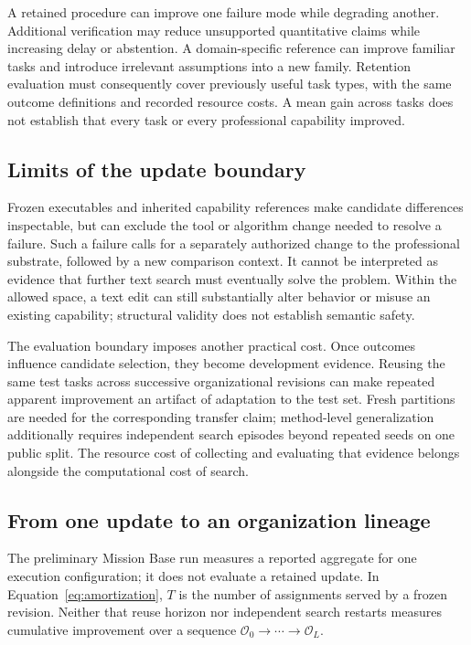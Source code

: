 A retained procedure can improve one failure mode while degrading another. Additional verification may reduce unsupported quantitative claims while increasing delay or abstention. A domain-specific reference can improve familiar tasks and introduce irrelevant assumptions into a new family. Retention evaluation must consequently cover previously useful task types, with the same outcome definitions and recorded resource costs. A mean gain across tasks does not establish that every task or every professional capability improved.

\subsection{Limits of the update boundary}
Frozen executables and inherited capability references make candidate differences inspectable, but can exclude the tool or algorithm change needed to resolve a failure. Such a failure calls for a separately authorized change to the professional substrate, followed by a new comparison context. It cannot be interpreted as evidence that further text search must eventually solve the problem. Within the allowed space, a text edit can still substantially alter behavior or misuse an existing capability; structural validity does not establish semantic safety.

The evaluation boundary imposes another practical cost. Once outcomes influence candidate selection, they become development evidence. Reusing the same test tasks across successive organizational revisions can make repeated apparent improvement an artifact of adaptation to the test set. Fresh partitions are needed for the corresponding transfer claim; method-level generalization additionally requires independent search episodes beyond repeated seeds on one public split. The resource cost of collecting and evaluating that evidence belongs alongside the computational cost of search.

\subsection{From one update to an organization lineage}
The preliminary Mission Base run measures a reported aggregate for one execution configuration; it does not evaluate a retained update. In Equation~\ref{eq:amortization}, $T$ is the number of assignments served by a frozen revision. Neither that reuse horizon nor independent search restarts measures cumulative improvement over a sequence $\mathcal O_0\rightarrow\cdots\rightarrow\mathcal O_L$.

